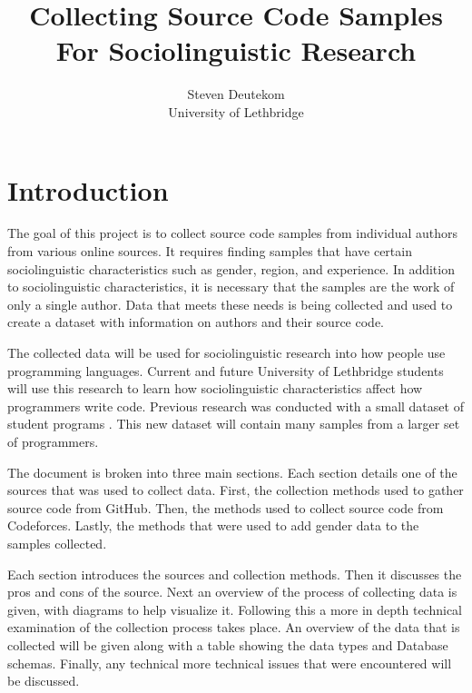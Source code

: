 \documentclass[12pt]{article}
\begin{document}
\begin{titlepage}
    \title{Collecting Source Code Samples For Sociolinguistic Research}
    \author{Steven Deutekom \\ University of Lethbridge}
    \maketitle
    \thispagestyle{empty}
\end{titlepage}



\newpage
\tableofcontents

\newpage
\listoffigures
\listoftables

\newpage
\doublespacing
{}
\section{Introduction}
The goal of this project is to collect source code samples from individual authors from various online sources. It requires finding samples that have certain sociolinguistic characteristics such as gender, region, and experience. In addition to sociolinguistic characteristics, it is necessary that the samples are the work of only a single author. Data that meets these needs is being collected and used to create a dataset with information on authors and their source code.

The collected data will be used for sociolinguistic research into how people use programming languages. Current and future University of Lethbridge students will use this research to learn how sociolinguistic characteristics affect how programmers write code. Previous research was conducted with a small dataset of student programs \cite{Naz2015} \cite{Rafee2017}. This new dataset will contain many samples from a larger set of programmers.

The document is broken into three main sections. Each section details one of the sources that was used to collect data. First, the collection methods used to gather source code from GitHub. Then, the methods used to collect source code from Codeforces. Lastly, the methods that were used to add gender data to the samples collected.

Each section introduces the sources and collection methods. Then it discusses the pros and cons of the source. Next an overview of the process of collecting data is given, with diagrams to help visualize it. Following this a more in depth technical examination of the collection process takes place. An overview of the data that is collected will be given along with a table showing the data types and Database schemas. Finally, any technical more technical issues that were encountered will be discussed.
\end{document}
